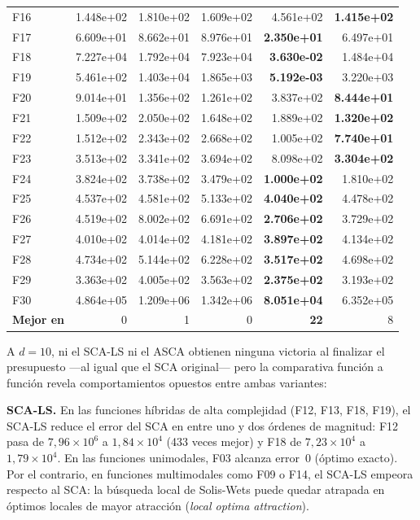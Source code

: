 \documentclass[12pt,a4paper]{article}
\begin{document}
\begin{longtable}{lrrrrr}
F16  & 1.448e+02 & 1.810e+02 & 1.609e+02 & 4.561e+02 & \textbf{1.415e+02} \\
F17  & 6.609e+01 & 8.662e+01 & 8.976e+01 & \textbf{2.350e+01} & 6.497e+01 \\
F18  & 7.227e+04 & 1.792e+04 & 7.923e+04 & \textbf{3.630e-02} & 1.484e+04 \\
F19  & 5.461e+02 & 1.403e+04 & 1.865e+03 & \textbf{5.192e-03} & 3.220e+03 \\
F20  & 9.014e+01 & 1.356e+02 & 1.261e+02 & 3.837e+02 & \textbf{8.444e+01} \\
F21  & 1.509e+02 & 2.050e+02 & 1.648e+02 & 1.889e+02 & \textbf{1.320e+02} \\
F22  & 1.512e+02 & 2.343e+02 & 2.668e+02 & 1.005e+02 & \textbf{7.740e+01} \\
F23  & 3.513e+02 & 3.341e+02 & 3.694e+02 & 8.098e+02 & \textbf{3.304e+02} \\
F24  & 3.824e+02 & 3.738e+02 & 3.479e+02 & \textbf{1.000e+02} & 1.810e+02 \\
F25  & 4.537e+02 & 4.581e+02 & 5.133e+02 & \textbf{4.040e+02} & 4.478e+02 \\
F26  & 4.519e+02 & 8.002e+02 & 6.691e+02 & \textbf{2.706e+02} & 3.729e+02 \\
F27  & 4.010e+02 & 4.014e+02 & 4.181e+02 & \textbf{3.897e+02} & 4.134e+02 \\
F28  & 4.734e+02 & 5.144e+02 & 6.228e+02 & \textbf{3.517e+02} & 4.698e+02 \\
F29  & 3.363e+02 & 4.005e+02 & 3.563e+02 & \textbf{2.375e+02} & 3.193e+02 \\
F30  & 4.864e+05 & 1.209e+06 & 1.342e+06 & \textbf{8.051e+04} & 6.352e+05 \\
\midrule
\textbf{Mejor en} & 0 & 1 & 0 & \textbf{22} & 8 \\
\end{longtable}
 
A $d=10$, ni el SCA-LS ni el ASCA obtienen ninguna victoria al finalizar el presupuesto ---al igual que el SCA original--- pero la comparativa función a función revela comportamientos opuestos entre ambas variantes:
 
\textbf{SCA-LS.} En las {funciones híbridas de alta complejidad} (F12, F13, F18, F19), el SCA-LS reduce el error del SCA en entre uno y dos órdenes de magnitud: F12 pasa de $7{,}96 \times 10^6$ a $1{,}84 \times 10^4$ (433 veces mejor) y F18 de $7{,}23 \times 10^4$ a $1{,}79 \times 10^4$. En las funciones unimodales, F03 alcanza error~0 (óptimo exacto). Por el contrario, en funciones multimodales como F09 o F14, el SCA-LS empeora respecto al SCA: la búsqueda local de Solis-Wets puede quedar atrapada en óptimos locales de mayor atracción (\textit{local optima attraction}).
 
\end{document}
